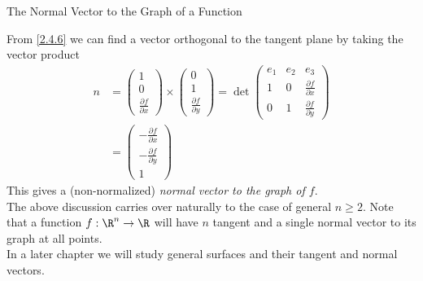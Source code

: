 \documentclass[smaller,hyperref={CJKbookmarks=true}]{beamer}
\begin{document}
\begin{frame}[t]{The Normal Vector to the Graph of a Function}
\begin{spacing}{1}
From \eqref{2.4.6} we can find a vector orthogonal to the tangent plane by
taking the vector product
\begin{equation*}
  \begin{split}
     n &=\begin{pmatrix}
           1 \\
           0 \\
           \frac{\partial f}{\partial x}
         \end{pmatrix}\times\begin{pmatrix}
                              0 \\
                              1 \\
                              \frac{\partial f}{\partial y}
                            \end{pmatrix}=\det\begin{pmatrix}
                                                e_1 &e_2 &e_3 \\
                                                1 &0 &\frac{\partial f}{\partial x} \\[4pt]
                                                0 &1 & \frac{\partial f}{\partial y}
                                              \end{pmatrix}  \\
       &=\begin{pmatrix}
           -\frac{\partial f}{\partial x} \\[3pt]
           -\frac{\partial f}{\partial y} \\[3pt]
           1
         \end{pmatrix}
  \end{split}
\end{equation*}
This gives a (non-normalized) \emph{normal vector to the graph of $f$}.\\[5pt]
The above discussion carries over naturally to the case of general $n\geq2$. Note that a function $f:\R^n\to\R$ will have $n$ tangent and a single normal vector to its graph at all points.\\[4pt]
In a later chapter we will study general surfaces and their tangent and
normal vectors.
\end{spacing}
\end{frame}
\end{document}
